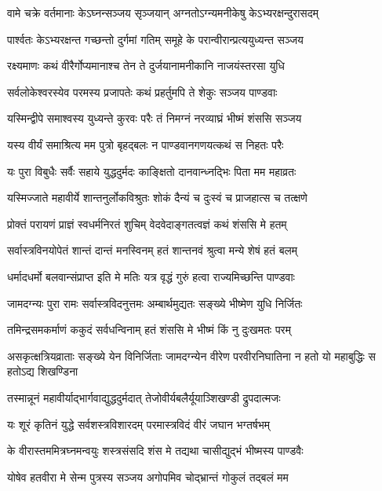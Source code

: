 \twolineshloka
{वामे चक्रे वर्तमानाः केऽघ्नन्सञ्जय सृञ्जयान्}
{अग्नतोऽग्न्यमनीकेषु केऽभ्यरक्षन्दुरासदम्}


\twolineshloka
{पार्श्वतः केऽभ्यरक्षन्त गच्छन्तो दुर्गमां गतिम्}
{समूहे के परान्वीरान्प्रत्ययुध्यन्त सञ्जय}


\twolineshloka
{रक्ष्यमाणः कथं वीरैर्गोप्यमानाश्च तेन ते}
{दुर्जयानामनीकानि नाजयंस्तरसा युधि}


\twolineshloka
{सर्वलोकेश्वरस्येव परमस्य प्रजापतेः}
{कथं प्रहर्तुमपि ते शेकुः सञ्जय पाण्डवाः}


\twolineshloka
{यस्मिन्द्वीपे समाश्वस्य युध्यन्ते कुरवः परैः}
{तं निमग्नं नरव्याघ्रं भीष्मं शंससि सञ्जय}


\twolineshloka
{यस्य वीर्यं समाश्रित्य मम पुत्रो बृहद्बलः}
{न पाण्डवानगणयत्कथं स निहतः परैः}


\twolineshloka
{यः पुरा विबुधैः सर्वैः सहाये युद्धदुर्मदः}
{काङ्क्षितो दानवान्ध्नद्भिः पिता मम महाव्रतः}


\twolineshloka
{यस्मिज्जाते महावीर्ये शान्तनुर्लोकविश्रुतः}
{शोकं दैन्यं च दुःस्वं च प्राजहात्स च तत्क्षणे}


\twolineshloka
{प्रोक्तं परायणं प्राज्ञं स्वधर्मनिरतं शुचिम्}
{वेदवेदाङ्गतत्वज्ञं कथं शंससि मे हतम्}


\twolineshloka
{सर्वास्त्रविनयोपेतं शान्तं दान्तं मनस्विनम्}
{हतं शान्तनवं श्रुत्वा मन्ये शेषं हतं बलम्}


\twolineshloka
{धर्मादधर्मो बलवान्संप्राप्त इति मे मतिः}
{यत्र वृद्धं गुरुं हत्वा राज्यमिच्छन्ति पाण्डवाः}


\twolineshloka
{जामदग्न्यः पुरा रामः सर्वास्त्रविदनुत्तमः}
{अम्बार्थमुद्यतः सङ्ख्ये भीष्मेण युधि निर्जितः}


\twolineshloka
{तमिन्द्रसमकर्माणं ककुदं सर्वधन्विनाम्}
{हतं शंससि मे भीष्मं किं नु दुःखमतः परम्}


\threelineshloka
{असकृत्क्षत्रियव्राताः सङ्ख्ये येन विनिर्जिताः}
{जामदग्न्येन वीरेण परवीरनिघातिना}
{न हतो यो महाबुद्धिः स हतोऽद्य शिखण्डिना}


\twolineshloka
{तस्मान्नूनं महावीर्याद्भार्गवाद्युद्धदुर्मदात्}
{तेजोवीर्यबलैर्यूयाञ्शिखण्डी द्रुपदात्मजः}


\twolineshloka
{यः शूरं कृतिनं युद्धे सर्वशस्त्रविशारदम्}
{परमास्त्रविदं वीरं जघान भग्तर्षभम्}


\twolineshloka
{के वीरास्तममित्रघ्नमन्वयुः शस्त्रसंसदि}
{शंस मे तद्यथा चासीद्युद्भं भीष्मस्य पाण्डवैः}


\twolineshloka
{योषेव हतवीरा मे सेन्म पुत्रस्य सञ्जय}
{अगोपमिव चोद्भ्रान्तं गोकुलं तद्बलं मम}


